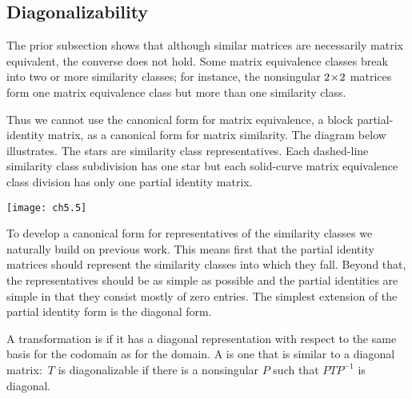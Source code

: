 \subsection{Diagonalizability}
The prior subsection shows that
although similar matrices are necessarily matrix equivalent, the converse
does not hold.
Some matrix equivalence classes break into two or more similarity 
classes; for instance, the nonsingular $2 \! \times \! 2$ matrices
form one matrix equivalence class but more than one similarity class.

Thus we cannot use the canonical form for matrix equivalence, 
a block partial-identity matrix, as a canonical form 
for matrix similarity. 
The diagram below illustrates. 
The stars are similarity class representatives.
Each dashed-line similarity class subdivision has one star 
but each solid-curve matrix equivalence class division has only one 
partial identity matrix.
\begin{center}
  \texttt{[image: ch5.5]}
\end{center}
To develop a canonical form for representatives of
the similarity classes
we naturally build on previous work.
This means 
first that the partial identity matrices should represent the similarity
classes into which they fall. 
Beyond that, the representatives should be as simple as possible and
the partial identities are simple in that they consist mostly of zero entries. 
The simplest extension of the partial identity form is the diagonal form.

\begin{definition}
A transformation is %
if it has a diagonal representation
with respect to the same basis for the codomain as for the domain.
A 
is one that is similar to a diagonal matrix:~\( T \) is diagonalizable
if there is a nonsingular \( P \) such that \( PTP^{-1} \) is diagonal.
\end{definition}

